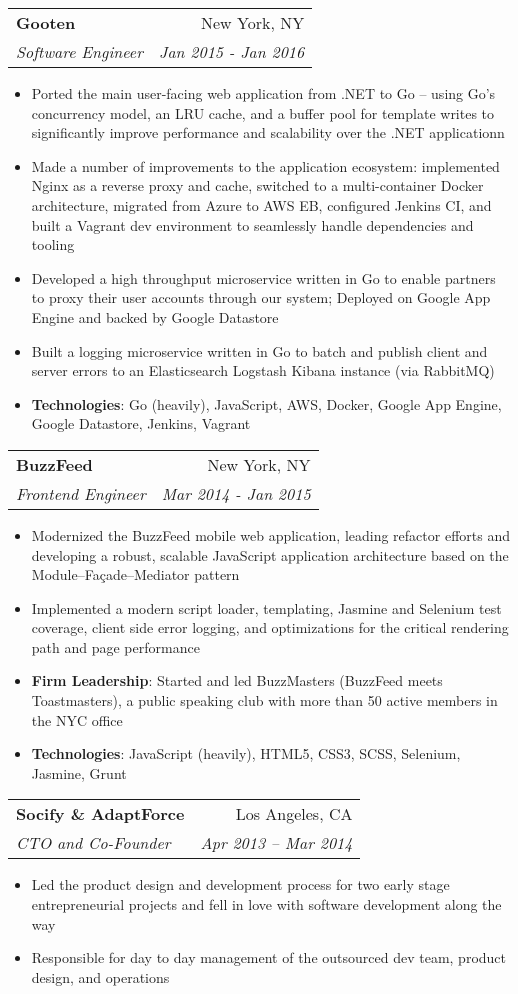 \documentclass[letterpaper,11pt]{article}
\makeatletter
\newcommand{\resumeItem}[2]{
  \item\small{
    \textbf{#1}{: #2 \vspace{-2pt}}
  }
}
\newcommand{\resumeItemSimple}[1]{
  \item\small{
    {#1 \vspace{-2pt}}
  }
}
\newcommand{\resumeSubheading}[4]{
  \vspace{-1pt}\item
    \begin{tabular*}{0.97\textwidth}[t]{l@{\extracolsep{\fill}}r}
      \textbf{#1} & #2 \\
      \textit{\small#3} & \textit{\small #4} \\
    \end{tabular*}\vspace{-5pt}
}
\newcommand{\resumeItemListStart}{\begin{itemize}}
\newcommand{\resumeItemListEnd}{\end{itemize}\vspace{-5pt}}
\makeatother
\begin{document}
    \resumeSubheading
      {Gooten}{New York, NY}
      {Software Engineer}{Jan 2015 - Jan 2016}
      \resumeItemListStart
        \resumeItemSimple
          {Ported the main user-facing web application from .NET to Go -- using Go’s concurrency model, an LRU cache, and a buffer pool for template writes to significantly improve performance and scalability over the .NET applicationn}
        \resumeItemSimple
          {Made a number of improvements to the application ecosystem: implemented Nginx as a reverse proxy and cache, switched to a multi-container Docker architecture, migrated from Azure to AWS EB, configured Jenkins CI, and built a Vagrant dev environment to seamlessly handle dependencies and tooling}
        \resumeItemSimple
          {Developed a high throughput microservice written in Go to enable partners to proxy their user accounts through our system; Deployed on Google App Engine and backed by Google Datastore}
        \resumeItemSimple
          {Built a logging microservice written in Go to batch and publish client and server errors to an Elasticsearch Logstash Kibana instance (via RabbitMQ)}
        \resumeItem{Technologies}
        {Go (heavily), JavaScript, AWS, Docker, Google App Engine, Google Datastore, Jenkins, Vagrant}
      \resumeItemListEnd

    \resumeSubheading
      {BuzzFeed}{New York, NY}
      {Frontend Engineer}{Mar 2014 - Jan 2015}
      \resumeItemListStart
        \resumeItemSimple
          {Modernized the BuzzFeed mobile web application, leading refactor efforts and developing a robust, scalable JavaScript application architecture based on the Module–Fa\c cade–Mediator pattern}
        \resumeItemSimple
          {Implemented a modern script loader, templating, Jasmine and Selenium test coverage, client side error logging, and optimizations for the critical rendering path and page performance}
        \resumeItem{Firm Leadership}
          {Started and led BuzzMasters (BuzzFeed meets Toastmasters), a public speaking club with more than 50 active members in the NYC office}
        \resumeItem{Technologies}
        {JavaScript (heavily), HTML5, CSS3, SCSS, Selenium, Jasmine, Grunt}
      \resumeItemListEnd
      
    \resumeSubheading
      {Socify \& AdaptForce}{Los Angeles, CA}
      {CTO and Co-Founder}{Apr 2013 – Mar 2014}
      \resumeItemListStart
        \resumeItemSimple
          {Led the product design and development process for two early stage entrepreneurial projects and fell in love with software development along the way}
        \resumeItemSimple
          {Responsible for day to day management of the outsourced dev team, product design, and operations}
      \resumeItemListEnd
\end{document}
